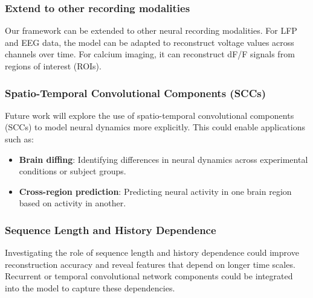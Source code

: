 \subsubsection{Extend to other recording modalities}
Our framework can be extended to other neural recording modalities. For LFP and EEG data, the model can be adapted to reconstruct voltage values across channels over time. For calcium imaging, it can reconstruct dF/F signals from regions of interest (ROIs).

\subsubsection{Spatio-Temporal Convolutional Components (SCCs)}
Future work will explore the use of spatio-temporal convolutional components (SCCs) to model neural dynamics more explicitly. This could enable applications such as:
\begin{itemize}
    \item \textbf{Brain diffing}: Identifying differences in neural dynamics across experimental conditions or subject groups.
    \item \textbf{Cross-region prediction}: Predicting neural activity in one brain region based on activity in another.
\end{itemize}

\subsubsection{Sequence Length and History Dependence}
Investigating the role of sequence length and history dependence could improve reconstruction accuracy and reveal features that depend on longer time scales. Recurrent or temporal convolutional network components could be integrated into the model to capture these dependencies.
